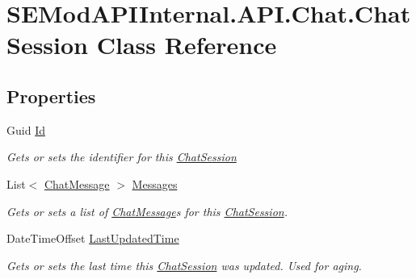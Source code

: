\hypertarget{class_s_e_mod_a_p_i_internal_1_1_a_p_i_1_1_chat_1_1_chat_session}{}\section{S\+E\+Mod\+A\+P\+I\+Internal.\+A\+P\+I.\+Chat.\+Chat\+Session Class Reference}
\label{class_s_e_mod_a_p_i_internal_1_1_a_p_i_1_1_chat_1_1_chat_session}
\subsection*{Properties}
\begin{DoxyCompactItemize}
\item 
Guid \hyperlink{class_s_e_mod_a_p_i_internal_1_1_a_p_i_1_1_chat_1_1_chat_session_a4dff80dea4ea97582682ac2d1e8642de}{Id}
\begin{DoxyCompactList}\small\item\em Gets or sets the identifier for this \hyperlink{class_s_e_mod_a_p_i_internal_1_1_a_p_i_1_1_chat_1_1_chat_session}{Chat\+Session} \end{DoxyCompactList}\item 
List$<$ \hyperlink{class_s_e_mod_a_p_i_internal_1_1_a_p_i_1_1_chat_1_1_chat_message}{Chat\+Message} $>$ \hyperlink{class_s_e_mod_a_p_i_internal_1_1_a_p_i_1_1_chat_1_1_chat_session_afaadec33e11a84223a04243681d90dea}{Messages}
\begin{DoxyCompactList}\small\item\em Gets or sets a list of \hyperlink{class_s_e_mod_a_p_i_internal_1_1_a_p_i_1_1_chat_1_1_chat_message}{Chat\+Message}s for this \hyperlink{class_s_e_mod_a_p_i_internal_1_1_a_p_i_1_1_chat_1_1_chat_session}{Chat\+Session}. \end{DoxyCompactList}\item 
Date\+Time\+Offset \hyperlink{class_s_e_mod_a_p_i_internal_1_1_a_p_i_1_1_chat_1_1_chat_session_a1dd4281e965d6288cfcd589c02c36451}{Last\+Updated\+Time}
\begin{DoxyCompactList}\small\item\em Gets or sets the last time this \hyperlink{class_s_e_mod_a_p_i_internal_1_1_a_p_i_1_1_chat_1_1_chat_session}{Chat\+Session} was updated. Used for aging. \end{DoxyCompactList}\end{DoxyCompactItemize}


